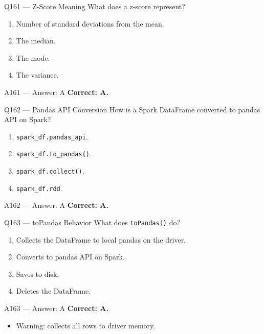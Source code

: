 \documentclass[aspectratio=169,9pt]{beamer}
\begin{document}
	\begin{frame}{Q161 --- Z-Score Meaning}
		What does a z-score represent?
		\begin{enumerate}[label=\Alph*.]
			\item Number of standard deviations from the mean.
			\item The median.
			\item The mode.
			\item The variance.
		\end{enumerate}
	\end{frame}
	
	\begin{frame}{A161 --- Answer: A}
		\textbf{Correct: A.}
	\end{frame}
	
	\begin{frame}{Q162 --- Pandas API Conversion}
		How is a Spark DataFrame converted to pandas API on Spark?
		\begin{enumerate}[label=\Alph*.]
			\item \texttt{spark\_df.pandas\_api}.
			\item \texttt{spark\_df.to\_pandas()}.
			\item \texttt{spark\_df.collect()}.
			\item \texttt{spark\_df.rdd}.
		\end{enumerate}
	\end{frame}
	
	\begin{frame}{A162 --- Answer: A}
		\textbf{Correct: A.}
	\end{frame}
	
	\begin{frame}{Q163 --- toPandas Behavior}
		What does \texttt{toPandas()} do?
		\begin{enumerate}[label=\Alph*.]
			\item Collects the DataFrame to local pandas on the driver.
			\item Converts to pandas API on Spark.
			\item Saves to disk.
			\item Deletes the DataFrame.
		\end{enumerate}
	\end{frame}
	
	\begin{frame}{A163 --- Answer: A}
		\textbf{Correct: A.}
		\begin{itemize}
			\item Warning: collects all rows to driver memory.
		\end{itemize}
	\end{frame}
	
\end{document}
